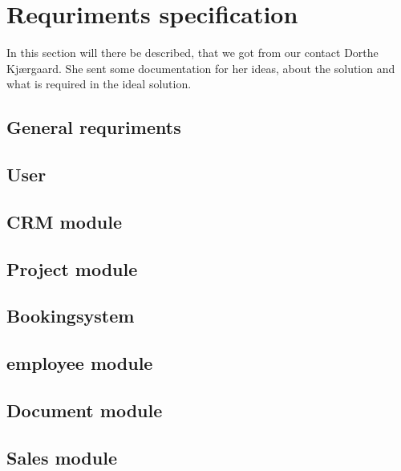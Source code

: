 \section{Requriments specification}
In this section will there be described, that we got from our contact Dorthe Kjærgaard. She sent some documentation for her ideas, about the solution and what is required in the ideal solution. 

\subsection{General requriments}


\subsection{User}


\subsection{CRM module}

\subsection{Project module}

\subsection{Bookingsystem}

\subsection{employee module}

\subsection{Document module}

\subsection{Sales module}







